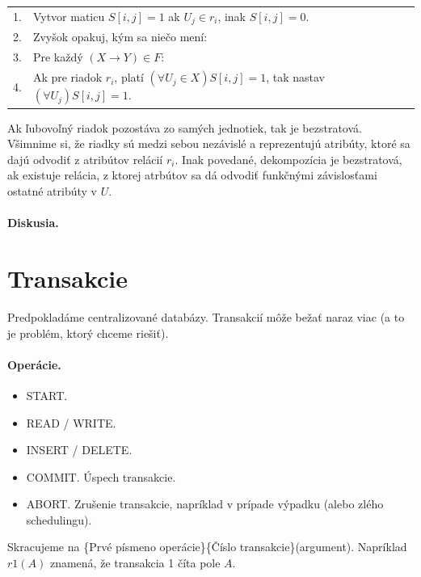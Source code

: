 \documentclass[10pt,a4paper]{article}
\begin{document}
\begin{tabular}{ll}
1. & Vytvor maticu $S[i,j] = 1$ ak $U_j \in r_i$, inak $S[i,j] = 0$.\\
2. & Zvyšok opakuj, kým sa niečo mení:\\
3. & Pre každý $(X \rightarrow Y) \in F$:\\
4. & Ak pre riadok $r_i$, platí $(\forall U_j \in X)S[i,j]=1$, tak nastav $(\forall U_j)S[i,j]=1$.\\
\end{tabular}

Ak ľubovoľný riadok pozostáva zo samých jednotiek, tak je bezstratová. Všimnime si, že riadky sú medzi sebou nezávislé a reprezentujú atribúty, ktoré sa dajú odvodiť z atribútov relácií $r_i$. 
Inak povedané, dekompozícia je bezstratová, ak existuje relácia, z ktorej atrbútov sa dá odvodiť funkčnými závislosťami ostatné atribúty v $U$. 

\paragraph{Diskusia.}
    
\section{Transakcie} 

Predpokladáme centralizované databázy. Transakcií môže bežať naraz viac (a to je problém, ktorý chceme riešiť).  

\paragraph{Operácie.}
\begin{itemize}
\item START.
\item READ / WRITE.
\item INSERT / DELETE.
\item COMMIT. Úspech transakcie. 
\item ABORT. Zrušenie transakcie, napríklad v prípade výpadku (alebo zlého schedulingu).  
\end{itemize}

Skracujeme na \{Prvé písmeno operácie\}\{Číslo transakcie\}(argument). Napríklad $r1(A)$ znamená, že transakcia 1 číta pole $A$. 
\end{document}
